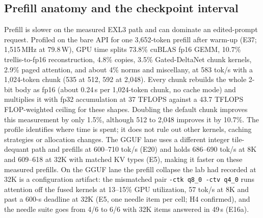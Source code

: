 \documentclass[11pt]{article}
\newcommand{\q}[1]{\texttt{#1}}
\begin{document}
\subsection{Prefill anatomy and the checkpoint interval}
\label{sec:prefill}

Prefill is slower on the measured EXL3 path and can dominate an edited-prompt
request. Profiled on the bare API for
one 3,652-token prefill after warm-up (E37; 1,515\,MHz at 79.8\,W), GPU time
splits 73.8\% cuBLAS fp16 GEMM, 10.7\% trellis-to-fp16 reconstruction, 4.8\%
copies, 3.5\% Gated-DeltaNet chunk kernels, 2.9\% paged attention, and about
4\% norms and miscellany, at 583 tok/s with a 1,024-token chunk (535 at 512,
592 at 2,048). Every chunk rebuilds the whole 2-bit body as fp16 (about
0.24\,s per 1,024-token chunk, no cache mode) and multiplies it with fp32
accumulation at 37 TFLOPS against a 43.7 TFLOPS FLOP-weighted ceiling for
these shapes. Doubling the default chunk improves this measurement by only
1.5\%, although 512 to 2,048 improves it by 10.7\%. The profile identifies
where time is spent; it does not rule out other kernels, caching strategies
or allocation changes. The GGUF lane uses a different integer tile-dequant
path and prefills at 600--710 tok/s
(E20) and holds 686--690 tok/s at 8K and 609--618 at 32K with matched KV
types (E5), making it faster on these measured prefills. On the
GGUF lane the prefill collapse the lab had recorded at 32K is a configuration
artifact: the mismatched pair \q{-ctk q8\_0 -ctv q4\_0} runs attention off the
fused kernels at 13--15\% GPU utilization, 57 tok/s at 8K and past a 600-s
deadline at 32K (E5, one needle item per cell; H4 confirmed), and the needle
suite goes from 4/6 to 6/6 with 32K items answered in 49\,s (E16a).
\end{document}
